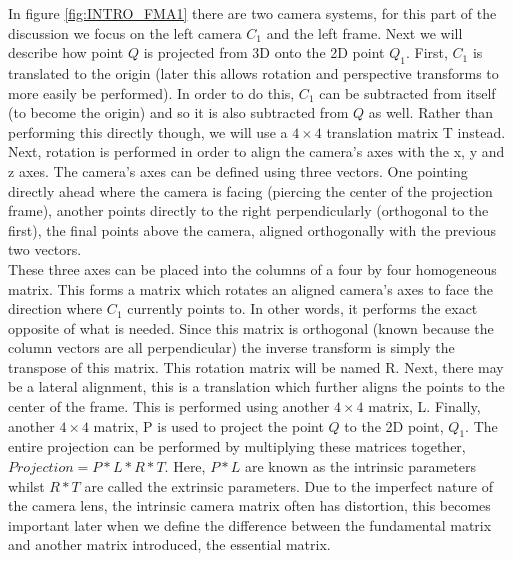 In figure \ref{fig:INTRO_FMA1} there are two camera systems, for this part of the discussion we focus on the left camera $C_{1}$ and the left frame. Next we will describe how point $Q$ is projected from 3D onto the 2D point $Q_{1}$. First, $C_{1}$ is translated to the origin (later this allows rotation and perspective transforms to more easily be performed). In order to do this, $C_{1}$ can be subtracted from itself (to become the origin) and so it is also subtracted from $Q$ as well. Rather than performing this directly though, we will use a $4 \times 4$ translation matrix T instead. Next, rotation is performed in order to align the camera's axes with the x, y and z axes. The camera's axes can be defined using three vectors. One pointing directly ahead where the camera is facing (piercing the center of the projection frame), another points directly to the right perpendicularly (orthogonal to the first), the final points above the camera, aligned orthogonally with the previous two vectors. \\

These three axes can be placed into the columns of a four by four homogeneous matrix. This forms a matrix which rotates an aligned camera's axes to face the direction where $C_1$ currently points to. In other words, it performs the exact opposite of what is needed. Since this matrix is orthogonal (known because the column vectors are all perpendicular) the inverse transform is simply the transpose of this matrix. This rotation matrix will be named R. Next, there may be a lateral alignment, this is a translation which further aligns the points to the center of the frame. This is performed using another $4 \times 4$ matrix, L. Finally, another $4 \times 4$ matrix, P is used to project the point $Q$ to the 2D point, $Q_1$. The entire projection can be performed by multiplying these matrices together, $Projection = P * L * R * T$. Here, $P * L$ are known as the intrinsic parameters whilst $R * T$ are called the extrinsic parameters. Due to the imperfect nature of the camera lens, the intrinsic camera matrix often has distortion, this becomes important later when we define the difference between the fundamental matrix and another matrix introduced, the essential matrix.

